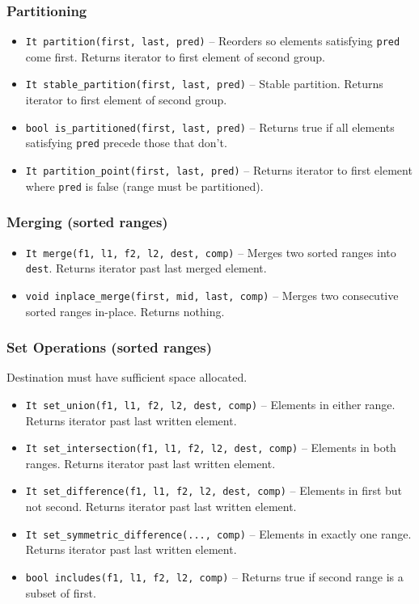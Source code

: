 \subsubsection{Partitioning}
\begin{itemize}
\item \texttt{It partition(first, last, pred)} -- Reorders so elements satisfying \texttt{pred} come first. Returns iterator to first element of second group.
\item \texttt{It stable\_partition(first, last, pred)} -- Stable partition. Returns iterator to first element of second group.
\item \texttt{bool is\_partitioned(first, last, pred)} -- Returns true if all elements satisfying \texttt{pred} precede those that don't.
\item \texttt{It partition\_point(first, last, pred)} -- Returns iterator to first element where \texttt{pred} is false (range must be partitioned).
\end{itemize}

\subsubsection{Merging (sorted ranges)}
\begin{itemize}
\item \texttt{It merge(f1, l1, f2, l2, dest, comp)} -- Merges two sorted ranges into \texttt{dest}. Returns iterator past last merged element.
\item \texttt{void inplace\_merge(first, mid, last, comp)} -- Merges two consecutive sorted ranges in-place. Returns nothing.
\end{itemize}

\subsubsection{Set Operations (sorted ranges)}
Destination must have sufficient space allocated.
\begin{itemize}
\item \texttt{It set\_union(f1, l1, f2, l2, dest, comp)} -- Elements in either range. Returns iterator past last written element.
\item \texttt{It set\_intersection(f1, l1, f2, l2, dest, comp)} -- Elements in both ranges. Returns iterator past last written element.
\item \texttt{It set\_difference(f1, l1, f2, l2, dest, comp)} -- Elements in first but not second. Returns iterator past last written element.
\item \texttt{It set\_symmetric\_difference(..., comp)} -- Elements in exactly one range. Returns iterator past last written element.
\item \texttt{bool includes(f1, l1, f2, l2, comp)} -- Returns true if second range is a subset of first.
\end{itemize}

